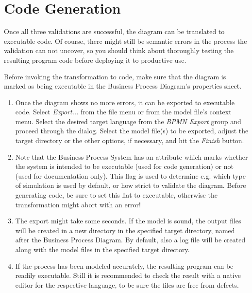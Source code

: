 \section{Code Generation}
\label{sec:user_tut_export}
	
Once all three validations are successful, the diagram can be translated to
executable code.  Of course, there might still be semantic errors in the process
the validation can not uncover, so you should think about thoroughly testing the
resulting program code before deploying it to productive use.

Before invoking the transformation to code, make sure that the diagram is marked
as being executable in the Business Process Diagram's properties sheet.
	
\begin{enumerate}

	\item Once the diagram shows no more errors, it can be exported to executable
	code.  Select \emph{Export...} from the file menu or from the model file's
	context menu.  Select the desired target language from the \emph{BPMN Export}
	group and proceed through the dialog.  Select the model file(s) to be exported,
	adjust the target directory or the other options, if necessary, and hit the
	\emph{Finish} button.
	
	\item Note that the Business Process System has an attribute which marks
	whether the system is intended to be executable (used for code generation) or
	not (used for documentation only).  This flag is used to determine e.g. which
	type of simulation is used by default, or how strict to validate the diagram.
	Before generating code, be sure to set this flat to executable, otherwise the
	transformation might abort with an error!
	
	\item The export might take some seconds.  If the model is sound, the output
	files will be created in a new directory in the specified target directory,
	named after the Business Process Diagram.  By default, also a log file will
	be created along with the model files in the specified target directory.
	
	\item If the process has been modeled accurately, the resulting program can
	be readily executable.  Still it is recommended to check the result with a
	native editor for the respective language, to be sure the files are free from
	defects.

\end{enumerate}

